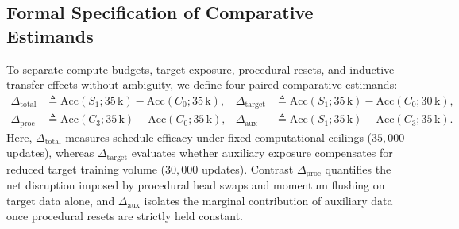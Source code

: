 \documentclass[10pt]{article}
\begin{document}
\begin{table}[t]
\caption{Controlled multi-phase intervention matrix across primary and ablation conditions. Checkpoint branching ensures that all arms within a seed block fork from the identical state $\bm{\theta}_1$.}\label{tab:intervention_matrix}
\centering
{}
\end{table}

\subsection{Formal Specification of Comparative Estimands}\label{subsec:schedule_estimands}

To separate compute budgets, target exposure, procedural resets, and inductive transfer effects without ambiguity, we define four paired comparative estimands:
\begin{align}
    \Delta_{\mathrm{total}} &\triangleq \mathrm{Acc}(S_1; 35\,\mathrm{k}) - \mathrm{Acc}(C_0; 35\,\mathrm{k}), & \Delta_{\mathrm{target}} &\triangleq \mathrm{Acc}(S_1; 35\,\mathrm{k}) - \mathrm{Acc}(C_0; 30\,\mathrm{k}), \label{eq:delta_target} \\
    \Delta_{\mathrm{proc}} &\triangleq \mathrm{Acc}(C_3; 35\,\mathrm{k}) - \mathrm{Acc}(C_0; 35\,\mathrm{k}), & \Delta_{\mathrm{aux}} &\triangleq \mathrm{Acc}(S_1; 35\,\mathrm{k}) - \mathrm{Acc}(C_3; 35\,\mathrm{k}). \label{eq:delta_aux}
\end{align}
Here, $\Delta_{\mathrm{total}}$ measures schedule efficacy under fixed computational ceilings ($35{,}000$ updates), whereas $\Delta_{\mathrm{target}}$ evaluates whether auxiliary exposure compensates for reduced target training volume ($30{,}000$ updates). Contrast $\Delta_{\mathrm{proc}}$ quantifies the net disruption imposed by procedural head swaps and momentum flushing on target data alone, and $\Delta_{\mathrm{aux}}$ isolates the marginal contribution of auxiliary data once procedural resets are strictly held constant.
\end{document}
